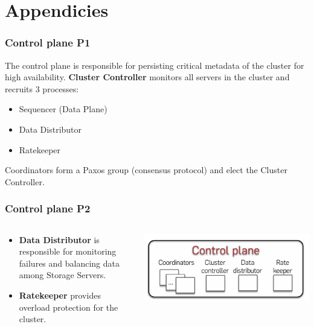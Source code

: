 \section{Appendicies}

\begin{frame}
	\frametitle{Control plane P1}

The control plane is responsible for persisting critical metadata of the cluster for high availability.
\textbf{Cluster Controller} monitors all servers in the cluster and recruits 3 processes:
\begin{itemize}
    \item Sequencer (Data Plane)
    \item Data Distributor
    \item Ratekeeper
\end{itemize}

Coordinators form a Paxos group (consensus protocol) and elect the Cluster Controller.
\end{frame}



\begin{frame}
    \frametitle{Control plane P2}
    \begin{columns}
        \begin{column}{0.5\textwidth}
        \begin{itemize}
        \item \textbf{Data Distributor} is responsible for monitoring failures and balancing data among Storage Servers.
        \item \textbf{Ratekeeper} provides overload protection for the cluster.
        \end{itemize}
        
        \end{column}
        \begin{column}{0.5\textwidth}
            \centering
            \includegraphics[width=\textwidth]{img/2-Architecture/Control plane.png}
        \end{column}
    \end{columns}
\end{frame}

